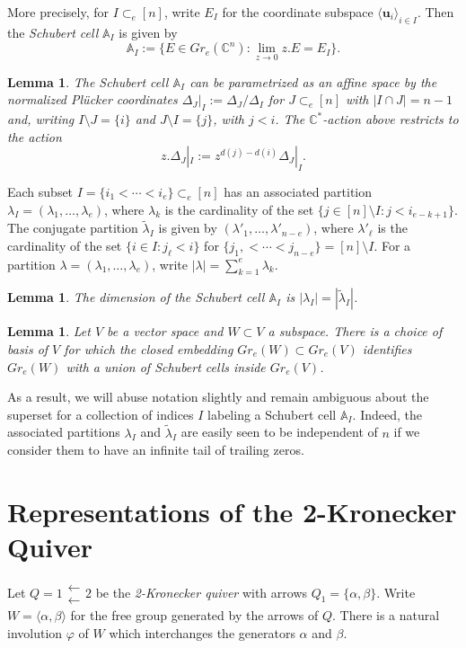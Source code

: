 \documentclass{amsart}
\newtheorem{lemma}[theorem]{Lemma}
\numberwithin{equation}{section}
\renewcommand{\AA}{\mathbb{A}}
\newcommand{\CC}{\mathbb{C}}
\newcommand{\bfu}{\mathbf{u}}
\begin{document}
  More precisely, for $I \subset_e [n]$, write $E_I$ for the coordinate subspace $\langle \bfu_i \rangle_{i \in I}$.
  Then the \emph{Schubert cell} $\AA_I$ is given by
  \[\AA_I:=\{E\in Gr_e(\CC^n):\lim_{z\to0} z.E=E_I\}.\]
  \begin{lemma}
    The Schubert cell $\AA_I$ can be parametrized as an affine space by the normalized Pl\"ucker coordinates $\Delta_J|_I:=\Delta_J/\Delta_I$ for $J \subset_e [n]$ with $|I\cap J|=n-1$ and, writing $I\setminus J=\{i\}$ and $J\setminus I=\{j\}$, with $j<i$.
    The $\CC^*$-action above restricts to the action 
    \[z.\Delta_J|_I:=z^{d(j)-d(i)} \Delta_J|_I.\]
  \end{lemma}

  Each subset $I=\{i_1<\cdots<i_e\} \subset_e [n]$ has an associated partition $\lambda_I=(\lambda_1,\ldots,\lambda_e)$, where $\lambda_k$ is the cardinality of the set $\{j \in [n]\setminus I: j < i_{e-k+1}\}$.
  The conjugate partition $\tilde{\lambda}_I$ is given by $(\lambda'_1,\ldots,\lambda'_{n-e})$, where $\lambda'_\ell$ is the cardinality of the set $\{i\in I:j_\ell < i\}$ for $\{j_1,<\cdots<j_{n-e}\}=[n]\setminus I$.
  For a partition $\lambda=(\lambda_1,\ldots,\lambda_e)$, write $|\lambda|=\sum\limits_{k=1}^e \lambda_k$.
  \begin{lemma}
    The dimension of the Schubert cell $\AA_I$ is $|\lambda_I|=|\tilde{\lambda}_I|$.
  \end{lemma}
  
  \begin{lemma}
    Let $V$ be a vector space and $W\subset V$ a subspace.
    There is a choice of basis of $V$ for which the closed embedding $Gr_e(W)\subset Gr_e(V)$ identifies $Gr_e(W)$ with a union of Schubert cells inside $Gr_e(V)$.
  \end{lemma}
  As a result, we will abuse notation slightly and remain ambiguous about the superset for a collection of indices $I$ labeling a Schubert cell $\AA_I$.
  Indeed, the associated partitions $\lambda_I$ and $\tilde{\lambda}_I$ are easily seen to be independent of $n$ if we consider them to have an infinite tail of trailing zeros.


\section{Representations of the 2-Kronecker Quiver}

  Let $Q=1\substack{\longleftarrow\\\longleftarrow} 2$ be the \emph{2-Kronecker quiver} with arrows $Q_1=\{\alpha,\beta\}$.
  Write $W=\langle\alpha,\beta\rangle$ for the free group generated by the arrows of $Q$.
  There is a natural involution $\varphi$ of $W$ which interchanges the generators $\alpha$ and $\beta$.
\end{document}
